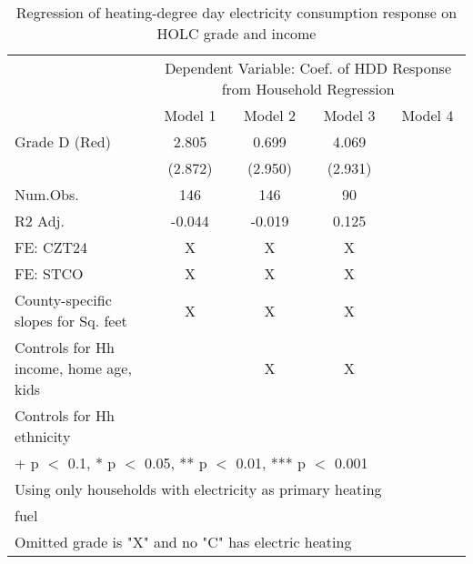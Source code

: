 \documentclass[border=1mm, preview]{standalone}
\begin{document}
\begin{table}

\caption{Regression of heating-degree day electricity consumption response on HOLC grade and income\label{tab:responseelectric1}}
\centering
\begin{tabular}[t]{lccc>{}c}
\toprule
\multicolumn{1}{c}{ } & \multicolumn{4}{c}{Dependent Variable: Coef. of HDD Response from Household Regression} \\
\cmidrule(l{3pt}r{3pt}){2-5}
  & Model 1 & Model 2 & Model 3 & Model 4\\
\midrule
Grade D (Red) & 2.805 & 0.699 & 4.069 & \cellcolor{blue}{\textcolor{white}{2.393}}\\
 & (2.872) & (2.950) & (2.931) & \cellcolor{blue}{\textcolor{white}{(4.040)}}\\
\midrule
Num.Obs. & 146 & 146 & 90 & \cellcolor{blue}{\textcolor{white}{85}}\\
R2 Adj. & -0.044 & -0.019 & 0.125 & \cellcolor{blue}{\textcolor{white}{0.092}}\\
FE: CZT24 & X & X & X & \cellcolor{blue}{\textcolor{white}{X}}\\
FE: STCO & X & X & X & \cellcolor{blue}{\textcolor{white}{X}}\\
County-specific slopes for Sq. feet & X & X & X & \cellcolor{blue}{\textcolor{white}{X}}\\
Controls for Hh income, home age, kids &  & X & X & \cellcolor{blue}{\textcolor{white}{X}}\\
Controls for Hh ethnicity &  &  &  & \cellcolor{blue}{\textcolor{white}{X}}\\
\bottomrule
\multicolumn{5}{l}{\textsuperscript{} + p $<$ 0.1, * p $<$ 0.05, ** p $<$ 0.01, *** p $<$ 0.001}\\
\multicolumn{5}{l}{\textsuperscript{} Using only households with electricity as primary heating}\\
\multicolumn{5}{l}{fuel}\\
\multicolumn{5}{l}{\textsuperscript{} Omitted grade is "X" and no "C" has electric heating}\\
\end{tabular}
\end{table}
\end{document}
